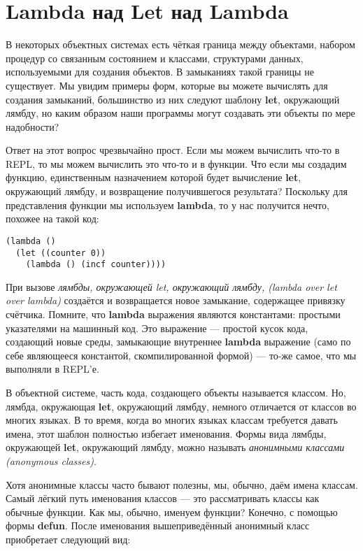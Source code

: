 \section{Lambda над Let над Lambda}\label{section_lambda_over_let_over_lambda}

В некоторых объектных системах есть чёткая граница между объектами, набором процедур со связанным состоянием и классами, структурами данных, используемыми для создания объектов. В замыканиях такой границы не существует. Мы увидим примеры форм, которые вы можете вычислять для создания замыканий, большинство из них следуют шаблону \textbf{let}, окружающий лямбду, но каким образом наши программы могут создавать эти объекты по мере надобности?

Ответ на этот вопрос чрезвычайно прост. Если мы можем вычислить что-то в REPL, то мы можем вычислить это что-то и в функции. Что если мы создадим функцию, единственным назначением которой будет вычисление \textbf{let}, окружающий лямбду, и возвращение получившегося результата? Поскольку для представления функции мы используем \textbf{lambda}, то у нас получится нечто, похожее на такой код:

\begin{verbatim}
(lambda ()
  (let ((counter 0))
    (lambda () (incf counter))))
\end{verbatim}

При вызове \emph{лямбды, окружающей let, окружающий лямбду, (lambda over let over lambda)} создаётся и возвращается новое замыкание, содержащее привязку счётчика. Помните, что \textbf{lambda} выражения являются константами: простыми указателями на машинный код. Это выражение --- простой кусок кода, создающий новые среды, замыкающие внутреннее \textbf{lambda} выражение (само по себе являющееся константой, скомпилированной формой) --- то-же самое, что мы выполняли в REPL'е.

В объектной системе, часть кода, создающего объекты называется классом. Но, лямбда, окружающая \textbf{let}, окружающий лямбду, немного отличается от классов во многих языках. В то время, когда во многих языках классам требуется давать имена, этот шаблон полностью избегает именования. Формы вида лямбды, окружающей \textbf{let}, окружающий лямбду, можно называть \emph{анонимными классами (anonymous classes)}.

Хотя анонимные классы часто бывают полезны, мы, обычно, даём имена классам. Самый лёгкий путь именования классов --- это рассматривать классы как обычные функции. Как мы, обычно, именуем функции? Конечно, с помощью формы \textbf{defun}. После именования вышеприведённый анонимный класс приобретает следующий вид:

